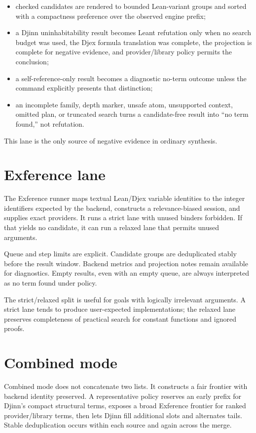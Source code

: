 \documentclass[10pt,letterpaper,oneside]{report}
\newcommand{\code}[1]{\texttt{\detokenize{#1}}}
\begin{document}
\begin{itemize}
  \item checked candidates are rendered to bounded Lean-variant groups and sorted with a compactness preference over the observed engine prefix;
  \item a Djinn uninhabitability result becomes Leant refutation only when no search budget was used, the Djex formula translation was complete, the \code{Frag} projection is complete for negative evidence, and provider/library policy permits the conclusion;
  \item a self-reference-only result becomes a diagnostic no-term outcome unless the command explicitly presents that distinction;
  \item an incomplete family, depth marker, unsafe atom, unsupported context, omitted plan, or truncated search turns a candidate-free result into ``no term found,'' not refutation.
\end{itemize}

This lane is the only source of negative evidence in ordinary synthesis.

\section{Exference lane}\label{sec:leant-exference-lane}

The Exference runner maps textual Lean/Djex variable identities to the integer identifiers expected by the backend, constructs a relevance-biased session, and supplies exact providers. It runs a strict lane with unused binders forbidden. If that yields no candidate, it can run a relaxed lane that permits unused arguments.

Queue and step limits are explicit. Candidate groups are deduplicated stably before the result window. Backend metrics and projection notes remain available for diagnostics. Empty results, even with an empty queue, are always interpreted as no term found under policy.

The strict/relaxed split is useful for goals with logically irrelevant arguments. A strict lane tends to produce user-expected implementations; the relaxed lane preserves completeness of practical search for constant functions and ignored proofs.

\section{Combined mode}

Combined mode does not concatenate two lists. It constructs a fair frontier with backend identity preserved. A representative policy reserves an early prefix for Djinn's compact structural terms, exposes a broad Exference frontier for ranked provider/library terms, then lets Djinn fill additional slots and alternates tails. Stable deduplication occurs within each source and again across the merge.
\end{document}
